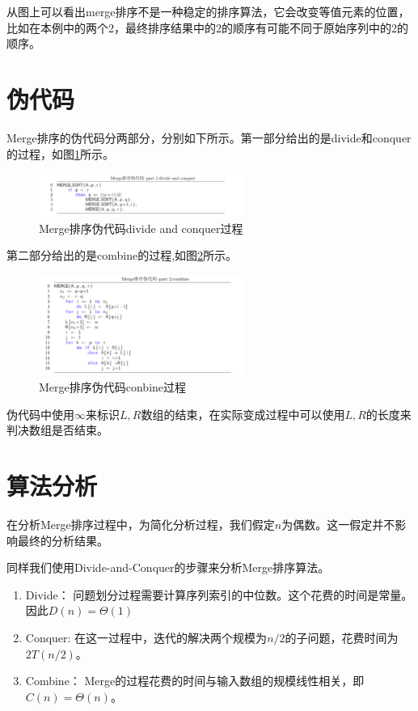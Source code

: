 \documentclass[10pt,a4paper,UTF8]{article}
\begin{document}
从图上可以看出merge排序不是一种稳定的排序算法，它会改变等值元素的位置，比如在本例中的两个2，最终排序结果中的2的顺序有可能不同于原始序列中的2的顺序。

\section{伪代码}
\label{sec:org0be6224}



Merge排序的伪代码分两部分，分别如下所示。第一部分给出的是divide和conquer的过程，如图\ref{fig:org3613662}所示。
\begin{figure}[htbp]
\centering
\includegraphics[width=0.6\textwidth]{../../img/computer_algorithms/20170703mergeSortDevideandConquer.png}
\caption{\label{fig:org3613662}
Merge排序伪代码divide and conquer过程}
\end{figure}


第二部分给出的是combine的过程,如图\ref{fig:org7f45a57}所示。

\begin{figure}[htbp]
\centering
\includegraphics[width=0.6\textwidth]{../../img/computer_algorithms/20170703mergeSortCombine.png}
\caption{\label{fig:org7f45a57}
Merge排序伪代码conbine过程}
\end{figure}


伪代码中使用\(\infty\)来标识\(L,R\)数组的结束，在实际变成过程中可以使用\(L,R\)的长度来判决数组是否结束。
\section{算法分析}
\label{sec:orgbdf1c31}



在分析Merge排序过程中，为简化分析过程，我们假定\(n\)为偶数。这一假定并不影响最终的分析结果。

同样我们使用Divide-and-Conquer的步骤来分析Merge排序算法。
\begin{enumerate}
\item Divide： 问题划分过程需要计算序列索引的中位数。这个花费的时间是常量。因此\(D(n)=\Theta(1)\)
\item Conquer: 在这一过程中，迭代的解决两个规模为\(n/2\)的子问题，花费时间为\(2T(n/2)\)。
\item Combine： Merge的过程花费的时间与输入数组的规模线性相关，即\(C(n)=\Theta(n)\)。
\end{enumerate}
\end{document}
